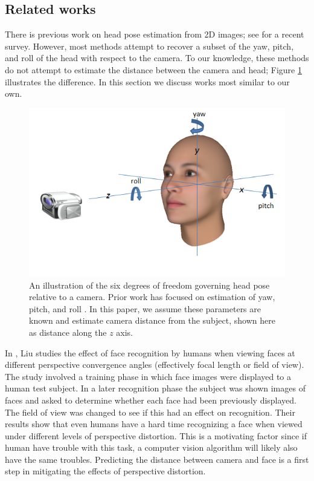 \documentclass[runningheads]{llncs}
\begin{document}
\subsection{Related works} \label{sec:related}
There is previous work on head pose estimation from 2D images; see \cite{murphy2009head} for a recent survey.
However, most methods attempt to recover a subset of the yaw, pitch, and roll of the head with respect to the camera.
To our knowledge, these methods do not attempt to estimate the distance between the camera and head; Figure \ref{fig:head_pose} illustrates the difference.
In this section we discuss works most similar to our own.

\begin{figure}[ht]
\centering
\includegraphics[width=1.0\linewidth]{resources/figures/head_pose.png}
\caption{
An illustration of the six degrees of freedom governing head pose relative to a camera.
Prior work has focused on estimation of yaw, pitch, and roll \cite{murphy2009head}.
In this paper, we assume these parameters are known and estimate camera distance from the subject, shown here as distance along the $z$ axis.
}
\label{fig:head_pose}
\end{figure}

In \cite{liu2003face,liu2006face}, Liu studies the effect of face recognition by humans when viewing faces at different perspective convergence angles (effectively focal length or field of view). 
The study involved a training phase in which face images were displayed to a human test subject.
In a later recognition phase the subject was shown images of faces and asked to determine whether each face had been previously displayed.
The field of view was changed to see if this had an effect on recognition. 
Their results show that even humans have a hard time recognizing a face when viewed under different levels of perspective distortion.  
This is a motivating factor since if human have trouble with this task, a computer vision algorithm will likely also have the same troubles.  
Predicting the distance between camera and face is a first step in mitigating the effects of perspective distortion.
\end{document}
